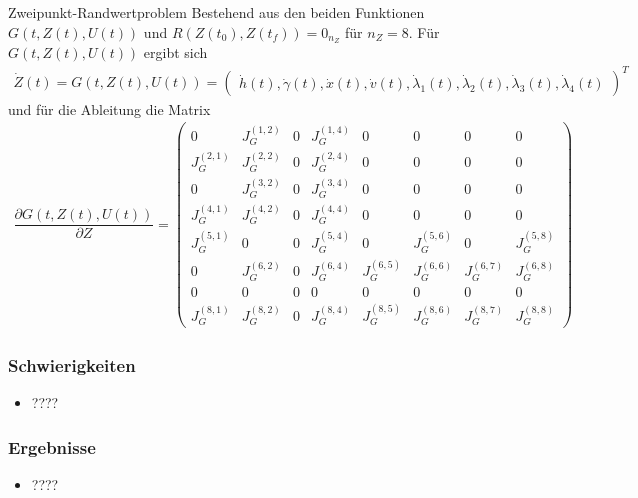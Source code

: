 \documentclass[aspectratio=169]{beamer}
\begin{document}
\begin{frame}
\begin{block}{Zweipunkt-Randwertproblem } 
  \scriptsize
Bestehend aus den beiden Funktionen $G(t,Z(t),U(t))$ und $R(Z(t_0),Z(t_f)) = 0_{n_Z}$ für $n_Z = 8$. Für $G(t,Z(t),U(t))$ ergibt sich
\begin{align*} 
    \dot{Z}(t) = G(t,Z(t),U(t)) = 
    \begin{pmatrix}
        \dot{h}(t),\dot{\gamma}(t),\dot{x}(t),\dot{v}(t),\dot{\lambda}_1(t),\dot{\lambda}_2(t),\dot{\lambda}_3(t),\dot{\lambda}_4(t)
    \end{pmatrix}^T
\end{align*}
und für die Ableitung die Matrix
\begin{align*} 
    \dfrac{\partial G(t,Z(t),U(t))}{\partial Z} = 
    \begin{pmatrix}
        0 & J_G^{(1,2)} & 0 & J_G^{(1,4)} & 0 & 0 & 0 & 0 \\ 
        J_G^{(2,1)} & J_G^{(2,2)} & 0 & J_G^{(2,4)} & 0 & 0 & 0 & 0 \\ 
        0 & J_G^{(3,2)} & 0 & J_G^{(3,4)} & 0 & 0 & 0 & 0 \\ 
        J_G^{(4,1)} & J_G^{(4,2)} & 0 & J_G^{(4,4)} & 0 & 0 & 0 & 0 \\
        J_G^{(5,1)} & 0 & 0 & J_G^{(5,4)} & 0 & J_G^{(5,6)} & 0 & J_G^{(5,8)} \\
        0 & J_G^{(6,2)} & 0 & J_G^{(6,4)} & J_G^{(6,5)} & J_G^{(6,6)} & J_G^{(6,7)} & J_G^{(6,8)} \\
        0 & 0 & 0 & 0 & 0 & 0 & 0 & 0 \\
        J_G^{(8,1)} & J_G^{(8,2)} & 0 & J_G^{(8,4)} & J_G^{(8,5)} & J_G^{(8,6)} & J_G^{(8,7)} & J_G^{(8,8)}
    \end{pmatrix}
\end{align*}
   \end{block}
\end{frame}






\begin{frame}
  \frametitle{Schwierigkeiten}
\vspace{-2.6cm}
  \begin{itemize}
    \item ????
  \end{itemize}
\end{frame}

\begin{frame}
  \frametitle{Ergebnisse}
\vspace{-2.6cm}
  \begin{itemize}
    \item ????
  \end{itemize}
\end{frame}
\end{document}
